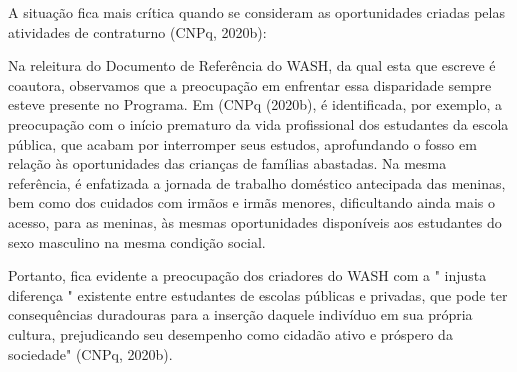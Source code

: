 A situação fica mais crítica quando se consideram as oportunidades criadas pelas atividades de contraturno (CNPq, 2020b):


\noindent\begin{center}\mbox{\centering{}}\end{center}


Na releitura do Documento de Referência do WASH, da qual esta que escreve é coautora, observamos que a preocupação em enfrentar essa disparidade sempre esteve presente no Programa. Em  (CNPq (2020b), é identificada, por exemplo, a preocupação com o início prematuro da vida profissional dos estudantes da escola pública, que acabam por interromper seus estudos, aprofundando o fosso em relação às oportunidades das crianças de famílias abastadas. Na mesma referência, é enfatizada a jornada de trabalho doméstico antecipada  das meninas, bem como dos cuidados com irmãos e irmãs menores, dificultando ainda mais o acesso, para as meninas, às mesmas oportunidades disponíveis aos estudantes do sexo masculino na mesma condição social.

Portanto, fica evidente a preocupação dos criadores do WASH com a " injusta diferença " existente entre estudantes de escolas públicas e privadas, que pode ter consequências duradouras para a inserção daquele indivíduo em sua própria cultura, prejudicando seu desempenho como cidadão ativo e próspero da sociedade" (CNPq, 2020b).


\noindent\begin{center}\mbox{\centering{}}\end{center}


